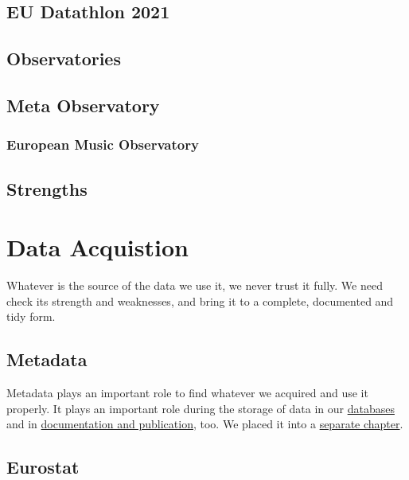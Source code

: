 \documentclass[
  fontsize=13pt,
  english,
  a4paper,
  openany, a4paper, oneside]{book}
\begin{document}
\hypertarget{eu-datathlon}{%
\section{EU Datathlon 2021}\label{eu-datathlon}}

\hypertarget{observatories}{%
\section{Observatories}\label{observatories}}

\hypertarget{meta-observatory}{%
\section{Meta Observatory}\label{meta-observatory}}

\hypertarget{emo}{%
\subsection{European Music Observatory}\label{emo}}

\hypertarget{strengths}{%
\section{Strengths}\label{strengths}}

\hypertarget{acquisition}{%
\chapter{Data Acquistion}\label{acquisition}}

Whatever is the source of the data we use it, we never trust it fully. We need check its strength and weaknesses, and bring it to a complete, documented and tidy form.

\hypertarget{collect-metadata}{%
\section{Metadata}\label{collect-metadata}}

Metadata plays an important role to find whatever we acquired and use it properly. It plays an important role during the storage of data in our \protect\hyperlink{data-storage}{databases} and in \protect\hyperlink{documentation}{documentation and publication}, too. We placed it into a \protect\hyperlink{metadata}{separate chapter}.

\hypertarget{eurostat}{%
\section{Eurostat}\label{eurostat}}
\end{document}
